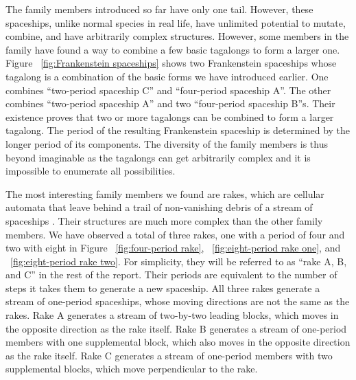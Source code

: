 \documentclass[12pt]{article}
\numberwithin{figure}{section} %
\begin{document}
The family members introduced so far have only one tail. However, these spaceships, unlike normal species in real life, have unlimited potential to mutate, combine, and have arbitrarily complex structures. However, some members in the family have found a way to combine a few basic tagalongs to form a larger one. Figure ~\ref{fig:Frankenstein spaceships} shows two Frankenstein spaceships whose tagalong is a combination of the basic forms we have introduced earlier. One combines “two-period spaceship C” and “four-period spaceship A”. The other combines “two-period spaceship A” and two “four-period spaceship B”s. Their existence proves that two or more tagalongs can be combined to form a larger tagalong. The period of the resulting Frankenstein spaceship is determined by the longer period of its components. The diversity of the family members is thus beyond imaginable as the tagalongs can get arbitrarily complex and it is impossible to enumerate all possibilities. 

The most interesting family members we found are rakes, which are cellular automata that leave behind a trail of non-vanishing debris of a stream of spaceships \cite{rake}. Their structures are much more complex than the other family members. We have observed a total of three rakes, one with a period of four and two with eight in Figure ~\ref{fig:four-period rake}, ~\ref{fig:eight-period rake one}, and ~\ref{fig:eight-period rake two}. For simplicity, they will be referred to as “rake A, B, and C” in the rest of the report. Their periods are equivalent to the number of steps it takes them to generate a new spaceship. All three rakes generate a stream of one-period spaceships, whose moving directions are not the same as the rakes. Rake A generates a stream of two-by-two leading blocks, which moves in the opposite direction as the rake itself. Rake B generates a stream of one-period members with one supplemental block, which also moves in the opposite direction as the rake itself. Rake C generates a stream of one-period members with two supplemental blocks, which move perpendicular to the rake. 
\end{document}
